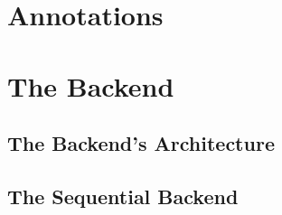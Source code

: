 

\section{Annotations}
\label{sec:Compiler.Core.Annotations}




\section{The Backend}
\subsection{The Backend's Architecture}
\subsection{The Sequential Backend}
